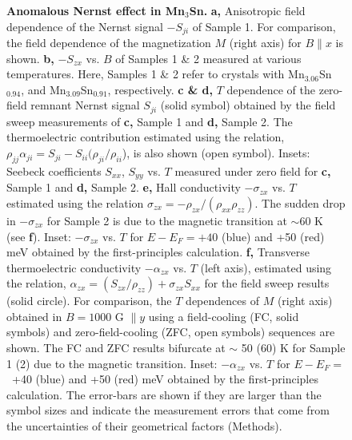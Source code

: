 \documentclass[amsmath,amssymb]{nature}
\begin{document}
\begin{figure}

\caption { {\bf Anomalous Nernst effect in Mn$_3$Sn.} {\bf a,} Anisotropic field dependence of the Nernst signal $-S_{ji}$ of Sample 1. For comparison, the field dependence of the magnetization $M$ (right axis) for $B \parallel x$ is shown. {\bf b,} $-S_{zx}$ vs. $B$ of Samples 1 \& 2 measured at various temperatures. Here, Samples 1 \& 2 refer to crystals with Mn$_{3.06}$Sn$_{0.94}$, and  Mn$_{3.09}$Sn$_{0.91}$, respectively. 
{\bf c \& d,} $T$ dependence of the zero-field remnant Nernst signal $S_{ji}$ (solid symbol) obtained by the field sweep measurements of {\bf c,} Sample 1 and {\bf d,} Sample 2. The thermoelectric contribution estimated using the relation, $\rho_{jj} \alpha_{ji} = S_{ji} - S_{ii} (\rho_{ji}/\rho_{ii}$), is also shown (open symbol).
Insets: Seebeck coefficients $S_{xx}$, $S_{yy}$ vs. $T$ measured under zero field for {\bf c,} Sample 1 and {\bf d,} Sample 2. 
{\bf e,} Hall conductivity $-\sigma_{zx}$ vs. $T$ estimated using the relation $\sigma_{zx} = -\rho_{zx}/(\rho_{xx}\rho_{zz})$. The sudden drop in $-\sigma_{zx}$ for Sample 2 is due to the magnetic transition at $\sim 60$ K (see {\bf f}). Inset:  $-\sigma_{zx}$ vs. $T$ for $E - E_{F} =+40$ (blue) and +50 (red) meV obtained by the first-principles calculation.
{\bf f,} Transverse thermoelectric conductivity $-\alpha_{zx}$ vs. $T$ (left axis), estimated using the relation, $\alpha_{zx} = (S_{zx}/\rho_{zz})+\sigma_{zx}S_{xx}$ for the field sweep results (solid circle). For comparison, the $T$ dependences of $M$ (right axis) obtained in $B = 1000$ G $\parallel y$ using a field-cooling (FC, solid symbols) and zero-field-cooling (ZFC, open symbols) sequences are shown.
The FC and ZFC results bifurcate at $\sim$ 50 (60) K for Sample 1 (2) due to the magnetic transition.  Inset: $-\alpha_{zx}$ vs. $T$ for $E - E_{F} =$~+40 (blue) and +50 (red) meV obtained by the first-principles calculation. The error-bars are shown if they are larger than the symbol sizes and indicate the measurement errors that come from the uncertainties of their geometrical factors (Methods).}

\end{figure}
\end{document}
